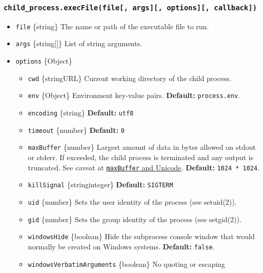 \subsubsection{\texorpdfstring{\texttt{child\_process.execFile(file{[},\ args{]}{[},\ options{]}{[},\ callback{]})}}{child\_process.execFile(file{[}, args{]}{[}, options{]}{[}, callback{]})}}\label{child_process.execfilefile-args-options-callback}

\begin{itemize}
\tightlist
\item
  \texttt{file} \{string\} The name or path of the executable file to
  run.
\item
  \texttt{args} \{string{[}{]}\} List of string arguments.
\item
  \texttt{options} \{Object\}

  \begin{itemize}
  \tightlist
  \item
    \texttt{cwd} \{string\textbar URL\} Current working directory of the
    child process.
  \item
    \texttt{env} \{Object\} Environment key-value pairs.
    \textbf{Default:} \texttt{process.env}.
  \item
    \texttt{encoding} \{string\} \textbf{Default:}
    \texttt{\textquotesingle{}utf8\textquotesingle{}}
  \item
    \texttt{timeout} \{number\} \textbf{Default:} \texttt{0}
  \item
    \texttt{maxBuffer} \{number\} Largest amount of data in bytes
    allowed on stdout or stderr. If exceeded, the child process is
    terminated and any output is truncated. See caveat at
    \hyperref[maxbuffer-and-unicode]{\texttt{maxBuffer} and Unicode}.
    \textbf{Default:} \texttt{1024\ *\ 1024}.
  \item
    \texttt{killSignal} \{string\textbar integer\} \textbf{Default:}
    \texttt{\textquotesingle{}SIGTERM\textquotesingle{}}
  \item
    \texttt{uid} \{number\} Sets the user identity of the process (see
    setuid(2)).
  \item
    \texttt{gid} \{number\} Sets the group identity of the process (see
    setgid(2)).
  \item
    \texttt{windowsHide} \{boolean\} Hide the subprocess console window
    that would normally be created on Windows systems. \textbf{Default:}
    \texttt{false}.
  \item
    \texttt{windowsVerbatimArguments} \{boolean\} No quoting or escaping

\end{itemize}
\end{itemize}

